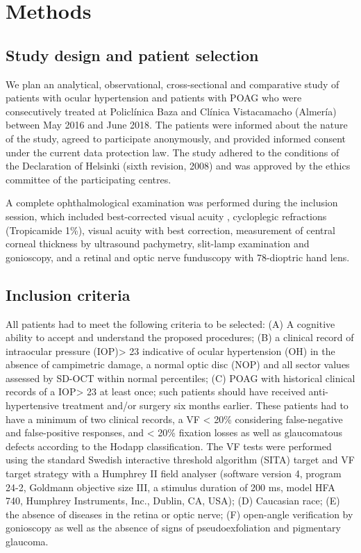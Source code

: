 \documentclass[fleqn,10pt]{wlscirep}
\begin{document}
\section*{Methods}

\subsection*{Study design and patient selection}

We plan an analytical, observational, cross-sectional and comparative study of patients with ocular hypertension and patients with POAG who were consecutively treated at Policlínica Baza and Clínica Vistacamacho (Almería) between May 2016 and June 2018. The patients were informed about the nature of the study, agreed to participate anonymously, and provided informed consent under the current data protection law. The study adhered to the conditions of the Declaration of Helsinki (sixth revision, 2008) and was approved by the ethics committee of the participating centres.

A complete ophthalmological examination was performed during the inclusion session, which included best-corrected visual acuity , cycloplegic refractions (Tropicamide 1\%), visual acuity with best correction, measurement of central corneal thickness by ultrasound pachymetry, slit-lamp examination and gonioscopy, and a retinal and optic nerve funduscopy with 78-dioptric hand lens.

\subsection*{Inclusion criteria}

All patients had to meet the following criteria to be selected: (A) A cognitive ability to accept and understand the proposed procedures; (B) a clinical record of intraocular pressure (IOP)> 23 indicative of ocular hypertension (OH) in the absence of campimetric damage, a normal optic disc (NOP) and all sector values assessed by SD-OCT within normal percentiles; (C) POAG with historical clinical records of a IOP> 23 at least once; such patients should have received anti-hypertensive treatment and/or surgery six months earlier. These patients had to have a minimum of two clinical records, a VF < 20\% considering false-negative and false-positive responses, and < 20\% fixation losses as well as glaucomatous defects according to the Hodapp classification. The VF tests were performed using the standard Swedish interactive threshold algorithm (SITA) target and VF target strategy with a Humphrey II field analyser (software version 4, program 24-2, Goldmann objective size III, a stimulus duration of 200 ms, model HFA 740, Humphrey Instruments, Inc., Dublin, CA, USA); (D) Caucasian race; (E) the absence of diseases in the retina or optic nerve; (F) open-angle verification by gonioscopy as well as the absence of signs of pseudoexfoliation and pigmentary glaucoma.
\end{document}

